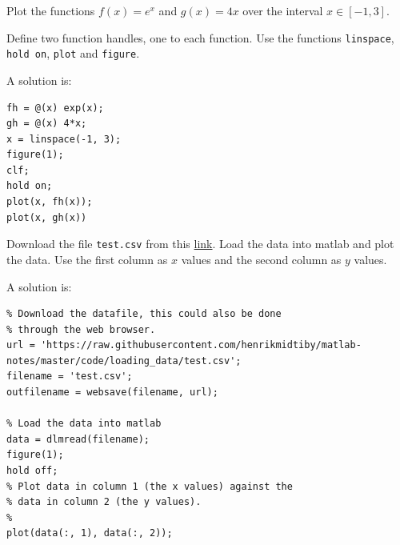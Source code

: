 \begin{ex}
Plot the functions $f(x) = e^x$ and $g(x) = 4x$ over the interval $x \in [-1, 3]$.
\begin{hint}
Define two function handles, one to each function.
Use the functions \verb!linspace!, \verb!hold on!, \verb!plot! and \verb!figure!.
\end{hint}
\begin{sol}
A solution is:
\begin{verbatim}
fh = @(x) exp(x);
gh = @(x) 4*x;
x = linspace(-1, 3);
figure(1);
clf;
hold on;
plot(x, fh(x));
plot(x, gh(x))
\end{verbatim}
\end{sol}
\end{ex}


\begin{ex}
Download the file \verb!test.csv! from this 
\href{https://raw.githubusercontent.com/henrikmidtiby/matlab-notes/master/code/loading_data/test.csv}{link}.
Load the data into matlab and plot the data.
Use the first column as $x$ values and the second column
as $y$ values.
\begin{hint}
\end{hint}
\begin{sol}
A solution is:
\begin{lstlisting}
% Download the datafile, this could also be done
% through the web browser.
url = 'https://raw.githubusercontent.com/henrikmidtiby/matlab-notes/master/code/loading_data/test.csv';
filename = 'test.csv';
outfilename = websave(filename, url);

% Load the data into matlab
data = dlmread(filename);
figure(1);
hold off;
% Plot data in column 1 (the x values) against the 
% data in column 2 (the y values).
%
plot(data(:, 1), data(:, 2));
\end{lstlisting}
\end{sol}
\end{ex}

